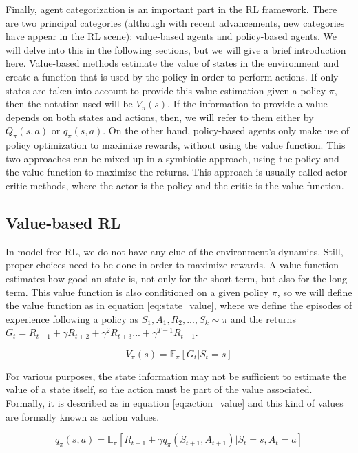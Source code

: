 Finally, agent categorization is an important part in the RL framework. There are two principal categories (although with recent advancements, new categories have appear in the RL scene): value-based agents and policy-based agents. We will delve into this in the following sections, but we will give a brief introduction here. Value-based methods estimate the value of states in the environment and create a function that is used by the policy in order to perform actions. If only states are taken into account to provide this value estimation given a policy $\pi$, then the notation used will be $V_{\pi}(s)$. If the information to provide a value depends on both states and actions, then, we will refer to them either by ${Q}_{\pi}(s,a)$ or ${q}_{\pi}(s,a)$. On the other hand, policy-based agents only make use of policy optimization to maximize rewards, without using the value function. This two approaches can be mixed up in a symbiotic approach, using the policy and the value function to maximize the returns. This approach is usually called actor-critic methods, where the actor is the policy and the critic is the value function.

\subsection{Value-based RL}
\label{sec:val-based-rl}
In model-free RL, we do not have any clue of the environment's dynamics. Still, proper choices need to be done in order to maximize rewards. A value function estimates how good an state is, not only for the short-term, but also for the long term. This value function is also conditioned on a given policy $\pi$, so we will define the value function as in equation \ref{eq:state_value}, where we define the episodes of experience following a policy as $S_1, A_1, R_2, ..., S_k \sim \pi$ and the returns $G_t = R_{t+1} + \gamma R_{t+2} + \gamma^2 R_{t+3} ... + \gamma^{T-1}R_{t-1}$.

\begin{equation} \label{eq:state_value}
	V_{\pi}(s) = \mathbb{E}_{\pi}[G_t | S_t = s]
\end{equation}

For various purposes, the state information may not be sufficient to estimate the value of a state itself, so the action must be part of the value associated. Formally, it is described as in equation \ref{eq:action_value} and this kind of values are formally known as action values.

\begin{equation} \label{eq:action_value}
	q_{\pi}(s,a) = \mathbb{E}_{\pi}[R_{t+1} + \gamma q_{\pi}(S_{t+1},A_{t+1}) | S_t=s , A_t=a]
\end{equation}


